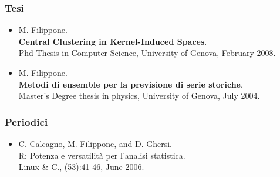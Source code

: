 \documentclass[a4paper,10pt]{article}
\begin{document}
\subsubsection*{Tesi}
\begin{itemize}
      \item M. Filippone.
	\\\textbf{Central Clustering in Kernel-Induced Spaces}.
	\\Phd Thesis in Computer Science, University of Genova, February 2008.
      \item M. Filippone.
	\\\textbf{Metodi di ensemble per la previsione di serie storiche}.
	\\Master's Degree thesis in physics, University of Genova, July 2004.
\end{itemize}

\subsubsection*{Periodici}
\begin{itemize}
      \item C. Calcagno, M. Filippone, and D. Ghersi.
	\\R: Potenza e versatilit\`a per l'analisi statistica.
	\\Linux \& C., (53):41-46, June 2006.
\end{itemize}
\end{document}
